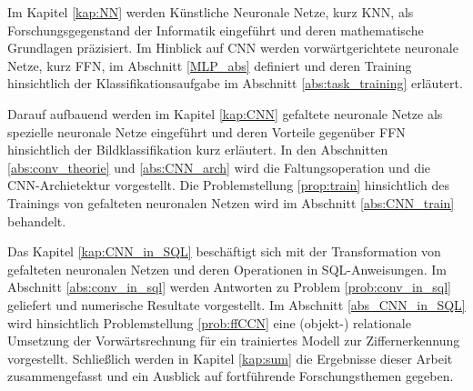 Im Kapitel \ref{kap:NN} werden Künstliche Neuronale Netze, kurz KNN, als Forschungsgegenstand der Informatik eingeführt und deren mathematische Grundlagen präzisiert. Im Hinblick auf CNN werden vorwärtgerichtete neuronale Netze, kurz FFN, im Abschnitt \ref{MLP_abs} definiert und deren Training hinsichtlich der Klassifikationsaufgabe im Abschnitt \ref{abs:task_training} erläutert. 

Darauf aufbauend werden im Kapitel \ref{kap:CNN} gefaltete neuronale Netze als spezielle neuronale Netze eingeführt und deren Vorteile gegenüber FFN hinsichtlich der Bildklassifikation kurz erläutert. In den Abschnitten \ref{abs:conv_theorie} und \ref{abs:CNN_arch} wird die Faltungsoperation und die CNN-Archietektur vorgestellt. Die Problemstellung \ref{prop:train} hinsichtlich des Trainings von gefalteten neuronalen Netzen wird im Abschnitt \ref{abs:CNN_train} behandelt.

Das Kapitel \ref{kap:CNN_in_SQL} beschäftigt sich mit der Transformation von gefalteten neuronalen Netzen und deren Operationen in SQL-Anweisungen. Im Abschnitt \ref{abs:conv_in_sql} werden Antworten zu Problem \ref{prob:conv_in_sql} geliefert und numerische Resultate vorgestellt. Im Abschnitt \ref{abs_CNN_in_SQL} wird hinsichtlich Problemstellung \ref{prob:ffCCN} eine (objekt-) relationale Umsetzung der
Vorwärtsrechnung für ein trainiertes Modell zur Ziffernerkennung vorgestellt. Schließlich werden in Kapitel \ref{kap:sum} die Ergebnisse dieser Arbeit zusammengefasst und ein Ausblick auf fortführende Forschungsthemen gegeben.

